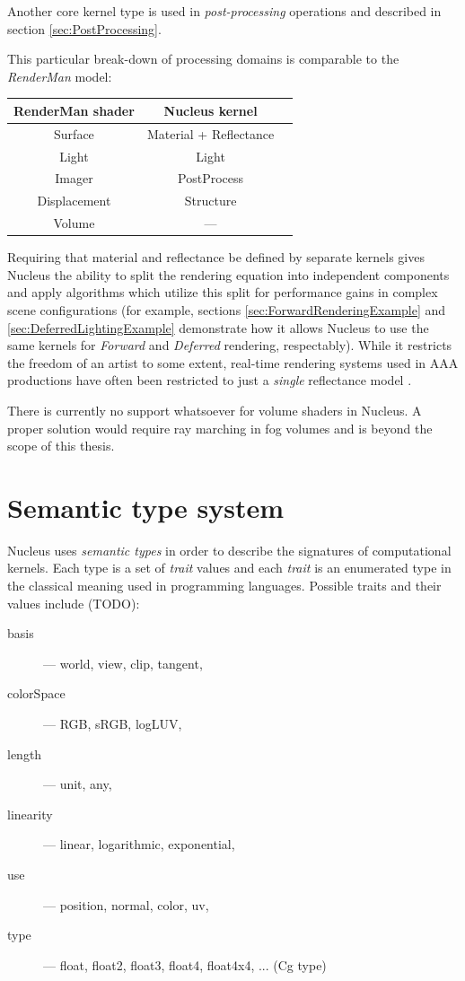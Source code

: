 Another core kernel type is used in \emph{post-processing} operations and described in section \ref{sec:PostProcessing}.

This particular break-down of processing domains is comparable to the \emph{RenderMan} model:

\begin{center}
\begin{tabular}{ | c | c | c | }
\hline
RenderMan shader & Nucleus kernel \\
\hline
Surface & Material + Reflectance \\
Light & Light \\
Imager & PostProcess \\
Displacement & Structure \\
Volume & --- \\
\hline
\end{tabular}
\end{center}

Requiring that material and reflectance be defined by separate kernels gives Nucleus the ability to split the rendering equation into independent components and apply algorithms which utilize this split for performance gains in complex scene configurations (for example, sections \ref{sec:ForwardRenderingExample} and \ref{sec:DeferredLightingExample} demonstrate how it allows Nucleus to use the same kernels for \emph{Forward} and \emph{Deferred} rendering, respectably). While it restricts the freedom of an artist to some extent, real-time rendering systems used in AAA productions have often been restricted to just a \emph{single} reflectance model \cite{CryEngine3Deferred, Killzone2Deferred}.

There is currently no support whatsoever for volume shaders in Nucleus. A proper solution would require ray marching in fog volumes and is beyond the scope of this thesis.

\section{Semantic type system}

Nucleus uses \emph{semantic types} in order to describe the signatures of computational kernels. Each type is a set of \emph{trait} values and each \emph{trait} is an enumerated type in the classical meaning used in programming languages. Possible traits and their values include (TODO):
\begin{description}
\item[basis] --- world, view, clip, tangent,
\item[colorSpace] --- RGB, sRGB, logLUV,
\item[length] --- unit, any,
\item[linearity] --- linear, logarithmic, exponential,
\item[use] --- position, normal, color, uv,
\item[type] --- float, float2, float3, float4, float4x4, ... (Cg type)
\end{description}

